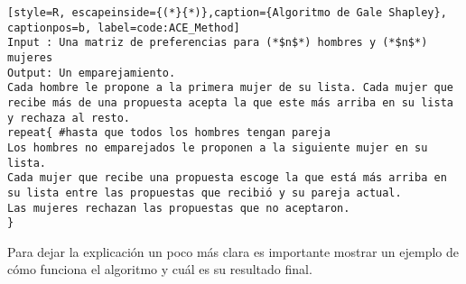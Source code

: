 \begin{lstlisting}[style=R, escapeinside={(*}{*)},caption={Algoritmo de Gale Shapley}, captionpos=b, label=code:ACE_Method]
Input : Una matriz de preferencias para (*$n$*) hombres y (*$n$*) mujeres 
Output: Un emparejamiento. 
Cada hombre le propone a la primera mujer de su lista. Cada mujer que recibe más de una propuesta acepta la que este más arriba en su lista y rechaza al resto. 
repeat{ #hasta que todos los hombres tengan pareja
Los hombres no emparejados le proponen a la siguiente mujer en su lista. 
Cada mujer que recibe una propuesta escoge la que está más arriba en su lista entre las propuestas que recibió y su pareja actual.
Las mujeres rechazan las propuestas que no aceptaron.
}
\end{lstlisting}
Para dejar la explicación un poco más clara es importante mostrar un ejemplo de cómo funciona el algoritmo y cuál es su resultado final.
